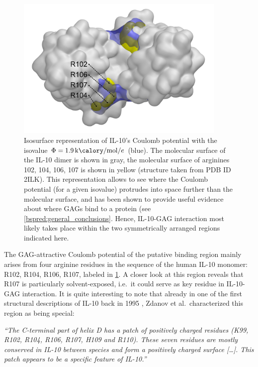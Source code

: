 \begin{figure}
\centering
\includegraphics[width=0.9\textwidth]{gfx/bspred/SI_figure_IL-10_coulomb_isosurface_1_9kcalmol.png}
\caption[]{
Isosurface representation of IL-10's Coulomb potential with the isovalue $\Phi =
\SI{1.9}{\kilo\calory\per\mole\per\elementarycharge}$ (blue). The molecular
surface of the IL-10 dimer is shown in gray, the molecular surface of arginines
102, 104, 106, 107 is shown in yellow (structure taken from PDB ID 2ILK). This
representation allows to see where the Coulomb potential (for a given isovalue)
protrudes into space further than the molecular surface, and has been shown to
provide useful evidence about where GAGs bind to a protein (see
\cref{bspred:general_conclusions}. Hence, IL-10-GAG interaction most likely
takes place within the two symmetrically arranged regions indicated here.}
\label{fig:bspred:il10_estatic_pred}
\end{figure}

The GAG-attractive Coulomb potential of the putative binding region mainly
arises from four arginine residues in the sequence of the human IL-10 monomer:
R102, R104, R106, R107, labeled in \cref{fig:bspred:il10_estatic_pred}. A closer
look at this region reveals that R107 is particularly solvent-exposed, i.e.\ it
could serve as key residue in IL-10-GAG interaction. It is quite interesting to
note that already in one of the first structural descriptions of IL-10 back in
1995 \cite{Zdanov1995}, Zdanov et al.\ characterized this region as being
special:

\begin{adjustwidth}{1.5cm}{1.5cm}
\textit{%
\enquote{The C-terminal part of helix D has a patch of positively
charged residues (K99, R102, R104, R106, R107, H109 and R110). These seven
residues are mostly conserved in IL-10 between species and form a positively
charged surface [\dots]. This patch appears to be a specific feature of IL-10.}}
\end{adjustwidth}


